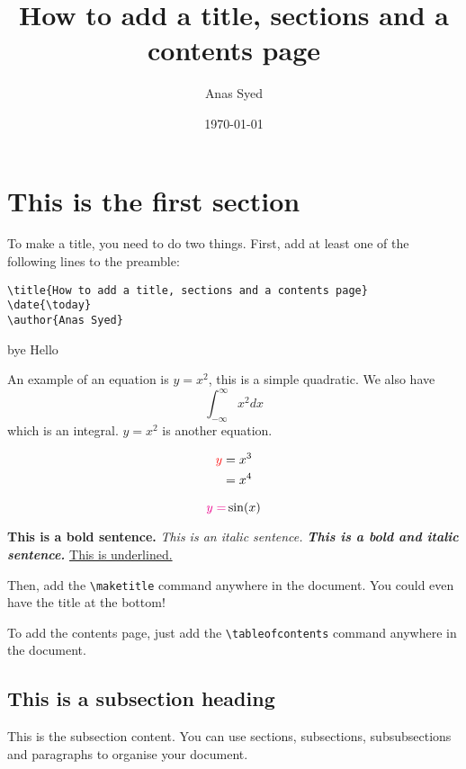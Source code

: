 \documentclass[a4paper,12pt]{article}
\title{How to add a title, sections and a contents page}
\date{\today}
\author{Anas Syed}
\begin{document}
\raggedright
\maketitle
\newpage %
\tableofcontents
\newpage %

\section{This is the first section}
To make a title, you need to do two things. First, add at least one of the following lines to the preamble: 

\begin{verbatim}
\title{How to add a title, sections and a contents page}
\date{\today}
\author{Anas Syed}
\end{verbatim}

\begin{center}
  bye
  \color{blue}
  Hello
\end{center}

An {\color{blue} example} of an equation is {\color{red} $y=x^2$}, this is a simple quadratic. We also have {\color{red}$$ \int_{-\infty}^{\infty}x^2 dx $$} which is an integral. \( y=x^2 \) is another equation.

\begin{align}
   \color{red}
  y &= x^3 \\
  & = x^4
\end{align}

\begin{equation}
  {\color{magenta}y =} \sin(x)
\end{equation}

\textbf{This is a bold sentence.} \textit{This is an italic sentence.} \textbf{\textit{This is a bold and italic sentence.}} \underline{This is underlined.}

Then, add the \verb|\maketitle| command anywhere in the document. You could even have the title at the bottom!

To add the contents page, just add the \verb|\tableofcontents| command anywhere in the document.

\subsection{This is a subsection heading}
This is the subsection content. You can use sections, subsections, subsubsections and paragraphs to organise your document.
\end{document}
